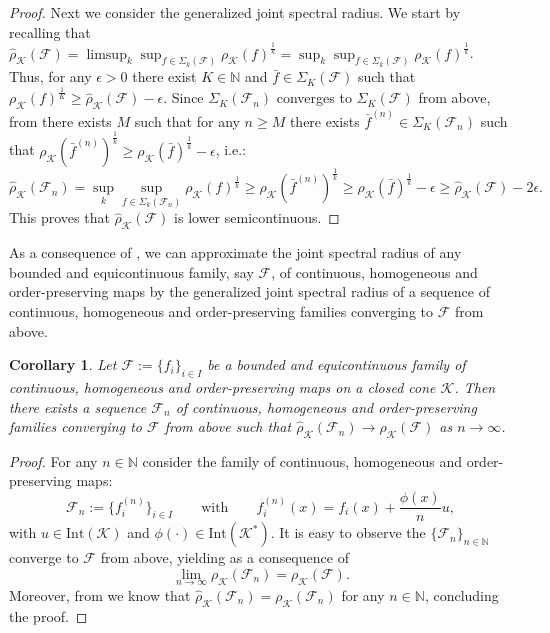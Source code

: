 \documentclass{article}
\newtheorem{corollary}[theorem]{Corollary}
\newcommand{\N}{\mathbb{N}}
\newcommand{\family}{\mathcal{F}}
\newcommand{\cradius}{\rho_{\cone}}
\newcommand{\cgradius}{\widehat{\rho}_{\cone}}
\newcommand{\cone}{\mathcal{K}}
\newcommand{\interior}{\mathrm{Int}}
\begin{document}
\begin{proof}
%
Next we consider the generalized joint spectral radius. 
%
We start by recalling that $\cgradius(\family)=\limsup_k \sup_{f\in\Sigma_k(\family)} \cradius(f)^{\frac{1}{k}}=\sup_k \sup_{f\in \Sigma_k(\family)} \cradius(f)^{\frac{1}{k}}$. 
%
Thus, for any $\epsilon>0$ there exist $K\in \N$ and $\bar{f}\in \Sigma_K(\family)$ such that $\cradius(f)^{\frac{1}{K}}\geq \cgradius(\family)-\epsilon$.
%
Since $\Sigma_K(\family_n)$ converges to $\Sigma_K(\family)$ from above, from  there exists $M$ such that for any $n\geq M$ there exists $\bar{f}^{(n)}\in \Sigma_K(\family_n)$ such that $\cradius(\bar{f}^{(n)})^{\frac{1}{k}}\geq \cradius(\bar{f})^{\frac{1}{k}}-\epsilon$, i.e.:
%
\begin{equation}
 \cgradius(\family_n)=\sup_{k}\sup_{f\in \Sigma_k(\family_n)}\cradius(f)^{\frac{1}{k}}\geq    \cradius(\bar{f}^{(n)})^{\frac{1}{k}}\geq \cradius(\bar{f})^{\frac{1}{k}}-\epsilon\geq \cgradius(\family)-2\epsilon. 
\end{equation}
%
This proves that $\cgradius(\family)$ is lower semicontinuous. 
%
\end{proof}
%
%
As a consequence of , we can approximate the joint spectral radius of any bounded and equicontinuous family, say $\family$, of continuous, homogeneous and order-preserving maps by the generalized joint spectral radius of a sequence of continuous, homogeneous and order-preserving families converging to $\family$ from above.
%
\begin{corollary}
    Let $\family:=\{f_i\}_{i\in I}$ be a bounded and equicontinuous family of continuous, homogeneous and order-preserving maps on a closed cone $\cone$. Then there exists a sequence $\family_n$ of continuous, homogeneous and order-preserving families converging to $\family$ from above such that $\cgradius(\family_n)\to \cradius(\family)$ as $n\to\infty$. 
\end{corollary}
%
\begin{proof}
    For any $n\in \N$ consider the family of continuous, homogeneous and order-preserving maps:
%
\begin{equation}
    \family_n:=\{f_i^{(n)}\}_{i\in I} \qquad \text{with} \qquad f_i^{(n)}(x)=f_i(x)+\frac{\phi(x)}{n}u,
\end{equation}
%
with $u\in \interior(\cone)$ and $\phi(\cdot)\in \interior(\cone^*)$.
It is easy to observe the $\{\family_n\}_{n\in \N}$ converge to $\family$ from above, yielding as a consequence of  
%
\begin{equation}
    \lim_{n\rightarrow \infty}\cradius(\family_n)=\cradius(\family).
\end{equation} 
%
Moreover, from  we know that $\cgradius(\family_n)=\cradius(\family_n)$ for any $n\in \N$, concluding the proof. \end{proof}
\end{document}
